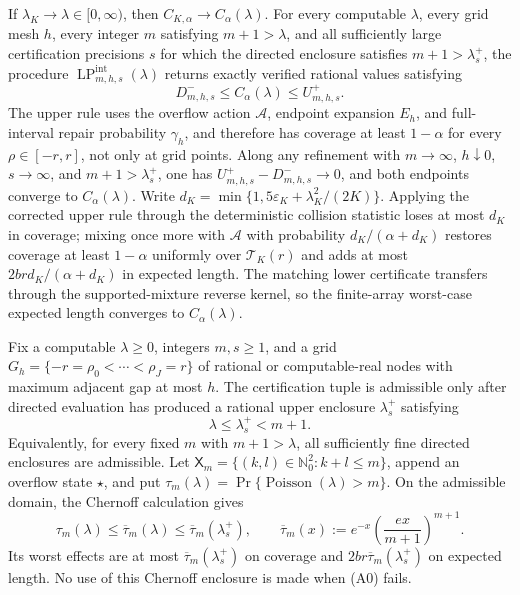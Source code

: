 If \(\lambda_K\to\lambda\in[0,\infty)\), then
\(C_{K,\alpha}\to C_\alpha(\lambda)\).  For every computable
\(\lambda\), every grid mesh \(h\), every integer \(m\) satisfying
\(m+1>\lambda\), and all sufficiently large certification precisions
\(s\) for which the directed enclosure satisfies
\(m+1>\lambda_s^+\), the procedure
\(\operatorname{LP}_{m,h,s}^{\mathrm{int}}(\lambda)\) returns exactly
verified rational values satisfying
\[
 D_{m,h,s}^-\le C_\alpha(\lambda)\le U_{m,h,s}^+.
\]
The upper rule uses the overflow action \(\mathcal A\), endpoint
expansion \(E_h\), and full-interval repair probability \(\gamma_h\),
and therefore has coverage at least \(1-\alpha\) for every
\(\rho\in[-r,r]\), not only at grid points.  Along any refinement with
\(m\to\infty\), \(h\downarrow0\), \(s\to\infty\), and
\(m+1>\lambda_s^+\), one has
\(U_{m,h,s}^+-D_{m,h,s}^-\to0\), and both endpoints converge to
\(C_\alpha(\lambda)\).  Write
\(d_K=\min\{1,5\varepsilon_K+\lambda_K^2/(2K)\}\).  Applying the
corrected upper rule through the deterministic collision statistic
loses at most \(d_K\) in coverage; mixing once more with
\(\mathcal A\) with probability \(d_K/(\alpha+d_K)\) restores coverage
at least \(1-\alpha\) uniformly over \(\mathcal T_K(r)\) and adds at
most \(2brd_K/(\alpha+d_K)\) in expected length.  The matching lower
certificate transfers through the supported-mixture reverse kernel,
so the finite-array worst-case expected length converges to
\(C_\alpha(\lambda)\).

Fix a computable \(\lambda\ge0\), integers \(m,s\ge1\), and a grid
\(G_h=\{-r=\rho_0<\cdots<\rho_J=r\}\) of rational or computable-real
nodes with maximum adjacent gap at most \(h\).  The certification tuple
is admissible only after directed evaluation has produced a rational
upper enclosure \(\lambda_s^+\) satisfying
\[
 \lambda\le\lambda_s^+<m+1.
 \tag{A0}
\]
Equivalently, for every fixed \(m\) with \(m+1>\lambda\), all
sufficiently fine directed enclosures are admissible.  Let
\(\mathsf X_m=\{(k,l)\in\mathbb N_0^2:k+l\le m\}\), append an overflow
state \(\star\), and put
\(\tau_m(\lambda)=\Pr\{\operatorname{Poisson}(\lambda)>m\}\).  On the
admissible domain, the Chernoff calculation gives
\[
 \tau_m(\lambda)\le\overline\tau_m(\lambda)
 \le\overline\tau_m(\lambda_s^+),\qquad
 \overline\tau_m(x):=
 e^{-x}\left(\frac{ex}{m+1}\right)^{m+1}.
 \tag{A1}
\]
Its worst effects are at most
\(\overline\tau_m(\lambda_s^+)\) on coverage and
\(2br\overline\tau_m(\lambda_s^+)\) on expected length.  No use of
this Chernoff enclosure is made when (A0) fails.

